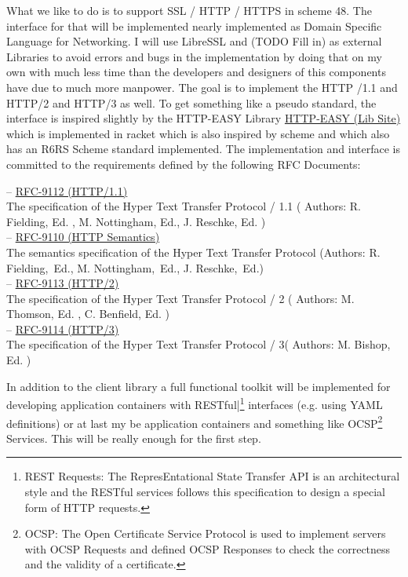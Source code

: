 \documentclass[10pt,a4paper,english]{article}
\begin{document}
\begin{flushleft}
What we like to do is to support SSL / HTTP  / HTTPS in scheme 48. The interface for that will be implemented nearly implemented as Domain Specific Language for Networking. I will use LibreSSL and (TODO Fill in) as external Libraries to avoid errors and bugs in the implementation by doing that on my own with much less time than the developers and designers of this components have due to much more manpower.  
The goal is to implement the HTTP /1.1 and HTTP/2 and HTTP/3 as well. To get something  like a pseudo standard,  the interface is inspired slightly by the HTTP-EASY Library
\href{https://pkgs.racket-lang.org/package/http-easy-lib}{HTTP-EASY (Lib Site)}  which is implemented in racket which is also inspired by scheme and which also has an R6RS Scheme standard implemented. 
The implementation and interface is committed to the requirements defined by the following RFC Documents:
\end{flushleft}
\begin{flushleft}
\hspace*{1em}-- \href{https://www.rfc-editor.org/rfc/rfc9112.pdf}{RFC-9112 (HTTP/1.1)}\\The specification of the Hyper Text Transfer Protocol / 1.1 ( Authors: R. Fielding, Ed. , M. Nottingham, Ed.,  J. Reschke, Ed. ) \\
\hspace*{1em}-- \href{https://www.rfc-editor.org/rfc/rfc9110.pdf}{RFC-9110 (HTTP Semantics)} \\The semantics specification of the Hyper Text Transfer Protocol (Authors: R. Fielding, Ed., M. Nottingham, Ed., J. Reschke, Ed.)\\
\hspace*{1em}-- \href{https://www.rfc-editor.org/rfc/rfc9113.pdf}{RFC-9113 (HTTP/2)} \\The specification of the Hyper Text Transfer Protocol / 2 ( Authors:             M. Thomson, Ed. , C. Benfield, Ed. )\\
\hspace*{1em}-- \href{https://www.rfc-editor.org/rfc/rfc9114.pdf}{RFC-9114 (HTTP/3)} \\The specification of the Hyper Text Transfer Protocol / 3( Authors: M. Bishop, Ed. ) \\
\end{flushleft}\begin{flushleft}
In addition to the client library a full  functional toolkit will be implemented for developing application containers with RESTful|\footnote{REST Requests: The RepresEntational State Transfer API is an architectural style and the RESTful services follows this specification to design a special form of HTTP requests.} interfaces (e.g. using YAML definitions) or at last my be application containers and something like OCSP\footnote{OCSP: The Open Certificate Service Protocol is used to implement servers with OCSP Requests and defined OCSP  Responses to check the correctness and the validity of a certificate.} Services.
This will be really enough for the first step.
\end{flushleft}
\end{document}
